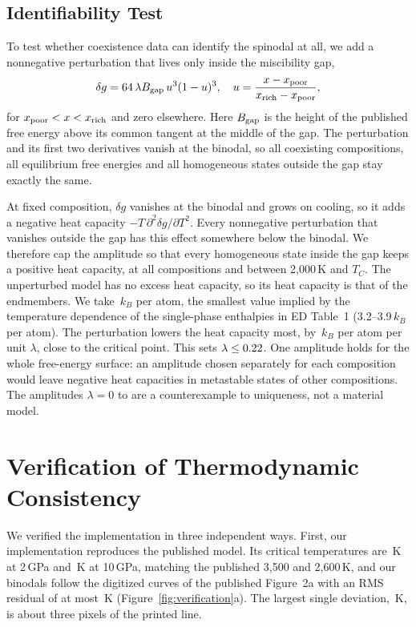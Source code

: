 \subsection{Identifiability Test}

To test whether coexistence data can identify the spinodal at all, we add a nonnegative
perturbation that lives only inside the miscibility gap,
\begin{equation}
\delta g = 64\,\lambda B_{\rm gap}\, u^3(1-u)^3,\quad
u = \frac{x-x_{\rm poor}}{x_{\rm rich}-x_{\rm poor}},
\label{eq:bump}
\end{equation}
for $x_{\rm poor}<x<x_{\rm rich}$ and zero elsewhere. Here $B_{\rm gap}$ is the height of the
published free energy above its common tangent at the middle of the gap. The perturbation and
its first two derivatives vanish at the binodal, so all coexisting compositions, all
equilibrium free energies and all homogeneous states outside the gap stay exactly the same.

At fixed composition, $\delta g$ vanishes at the binodal and grows on cooling, so it adds a
negative heat capacity $-T\,\partial^2\delta g/\partial T^2$. Every nonnegative perturbation that
vanishes outside the gap has this effect somewhere below the binodal. We therefore cap the amplitude so
that every homogeneous state inside the gap keeps a positive heat capacity, at all compositions
and between 2,000\,K and $T_C$. The unperturbed model has no excess heat capacity, so its heat
capacity is that of the endmembers. We take \bumpCpBase{}\,$k_B$ per atom, the smallest value
implied by the temperature dependence of the single-phase enthalpies in ED Table~1
(3.2--3.9\,$k_B$ per atom). The perturbation lowers the heat capacity most, by
\bumpCpWorst{}\,$k_B$ per atom per unit $\lambda$, close to the critical point. This sets
$\lambda \leq 0.22{}$. One amplitude holds for the whole free-energy surface: an
amplitude chosen separately for each composition would leave negative heat capacities in
metastable states of other compositions. The amplitudes $\lambda = 0$ to \bumpLambdaMax{} are a
counterexample to uniqueness, not a material model.

\section{Verification of Thermodynamic Consistency}\label{sec:verification}

We verified the implementation in three independent ways. First, our implementation
reproduces the published model. Its critical temperatures are \pubTcTwo{}\,K at 2\,GPa and
\pubTcTen{}\,K at 10\,GPa, matching the published 3,500 and 2,600\,K, and our binodals follow
the digitized curves of the published Figure~2a with an RMS residual of at most \digRms{}\,K
(Figure~\ref{fig:verification}a). The largest single deviation, \digMax{}\,K, is about three
pixels of the printed line.

